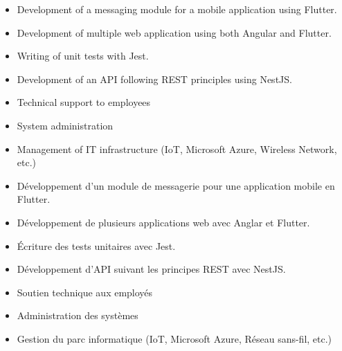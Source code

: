 \documentclass[10pt,a4paper,ragged2e,withhyper]{altacv}
\begin{document}
\begin{paracol}{2}
        \cvsection{
            }
            \begin{itemize}
                \item Development of a messaging module for a mobile application using Flutter.
                \item Development of multiple web application using both Angular and Flutter.
                \item Writing of unit tests with Jest.
                \item Development of an API following REST principles using NestJS.
            \end{itemize}
            \divider
            
            \begin{itemize}
                \item Technical support to employees
                \item System administration
                \item Management of IT infrastructure (IoT, Microsoft Azure, Wireless Network, etc.)
            \end{itemize}
        \begin{itemize}
            \item Développement d'un module de messagerie pour une application mobile en Flutter.
            \item Développement de plusieurs applications web avec Anglar et Flutter.
            \item Écriture des tests unitaires avec Jest.
            \item Développement d'API suivant les principes REST avec NestJS.
        \end{itemize}
        \divider
        
        \begin{itemize}
            \item Soutien technique aux employés
            \item Administration des systèmes
            \item Gestion du parc informatique (IoT, Microsoft Azure, Réseau sans-fil, etc.)
        \end{itemize}
        

\end{paracol}
\end{document}
